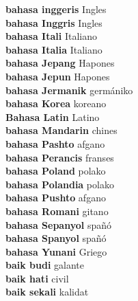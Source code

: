\textbf{ bahasa inggeris  } Ingles \\
\textbf{ bahasa Inggris  } Ingles \\
\textbf{ bahasa Itali  } Italiano \\
\textbf{ bahasa Italia  } Italiano \\
\textbf{ bahasa Jepang  } Hapones \\
\textbf{ bahasa Jepun  } Hapones \\
\textbf{ bahasa Jermanik  } germániko \\
\textbf{ bahasa Korea  } koreano \\
\textbf{ Bahasa Latin  } Latino \\
\textbf{ bahasa Mandarin  } chines \\
\textbf{ bahasa Pashto  } afgano \\
\textbf{ bahasa Perancis  } franses \\
\textbf{ bahasa Poland  } polako \\
\textbf{ bahasa Polandia  } polako \\
\textbf{ bahasa Pushto  } afgano \\
\textbf{ bahasa Romani  } gitano \\
\textbf{ bahasa Sepanyol  } spañó \\
\textbf{ bahasa Spanyol  } spañó \\
\textbf{ bahasa Yunani  } Griego \\
\textbf{ baik budi  } galante \\
\textbf{ baik hati  } civil \\
\textbf{ baik sekali  } kalidat \\
